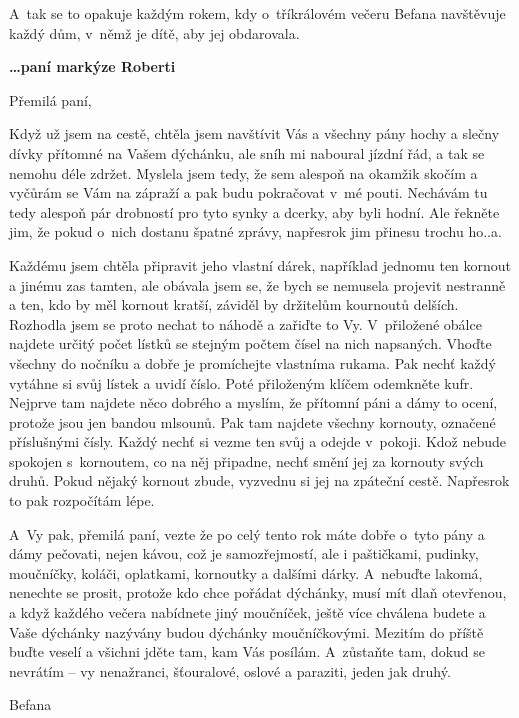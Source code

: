 \medskip

\noindent
A~tak se to opakuje každým rokem, kdy o~tříkrálovém večeru Befana navštěvuje každý dům, v němž je dítě, aby jej obdarovala.

\medskip

\noindent
\textbf{\ldots paní markýze Roberti}

\noindent
Přemilá paní,

\noindent
Když už jsem na cestě, chtěla jsem navštívit Vás a všechny pány hochy a slečny dívky přítomné na Vašem dýchánku, ale sníh mi naboural jízdní řád, a tak se nemohu déle zdržet. Myslela jsem tedy, že sem alespoň na okamžik skočím a vyčůrám se Vám na zápraží a pak budu pokračovat v mé pouti. Nechávám tu tedy alespoň pár drobností pro tyto synky a dcerky, aby byli hodní. Ale řekněte jim, že pokud o~nich dostanu špatné zprávy, napřesrok jim přinesu trochu ho..a.

Každému jsem chtěla připravit jeho vlastní dárek, například jednomu ten kornout a jinému zas tamten, ale obávala jsem se, že bych se nemusela projevit nestranně a ten, kdo by měl kornout kratší, záviděl by držitelům kournoutů delších. Rozhodla jsem se proto nechat to náhodě a zařiďte to Vy. V přiložené obálce najdete určitý počet lístků se stejným počtem čísel na nich napsaných. Vhoďte všechny do nočníku a dobře je promíchejte vlastníma rukama. Pak nechť každý vytáhne si svůj lístek a uvidí číslo. Poté přiloženým klíčem odemkněte kufr. Nejprve tam najdete něco dobrého a myslím, že přítomní páni a dámy to ocení, protože jsou jen bandou mlsounů. Pak tam najdete všechny kornouty, označené příslušnými čísly. Každý nechť si vezme ten svůj a odejde v pokoji. Kdož nebude spokojen s kornoutem, co na něj připadne, nechť smění jej za kornouty svých druhů. Pokud nějaký kornout zbude, vyzvednu si jej na zpáteční cestě. Napřesrok to pak rozpočítám lépe.

A~Vy pak, přemilá paní, vezte že po celý tento rok máte dobře o~tyto pány a dámy pečovati, nejen kávou, což je samozřejmostí, ale i paštičkami, pudinky, moučníčky, koláči, oplatkami, kornoutky a dalšími dárky. A~nebuďte lakomá, nenechte se prosit, protože kdo chce pořádat dýchánky, musí mít dlaň otevřenou, a když každého večera nabídnete jiný moučníček, ještě více chválena budete a Vaše dýchánky nazývány budou dýchánky moučníčkovými. Mezitím do příště buďte veselí a všichni jděte tam, kam Vás posílám. A~zůstaň\-te tam, dokud se nevrátím -- vy nenažranci, šťouralové, oslové a paraziti, jeden jak druhý.

Befana

